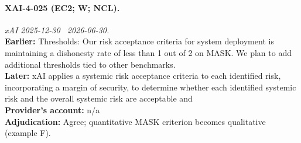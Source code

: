 \paragraph{XAI-4-025 (EC2; W; NCL).} \emph{xAI 2025-12-30 \textrightarrow\ 2026-06-30.}\\
\textbf{Earlier:} Thresholds: Our risk acceptance criteria for system deployment is maintaining a dishonesty rate of less than 1 out of 2 on MASK. We plan to add additional thresholds tied to other benchmarks.\\
\textbf{Later:} xAI applies a systemic risk acceptance criteria to each identified risk, incorporating a margin of security, to determine whether each identified systemic risk and the overall systemic risk are acceptable and\\
\textbf{Provider's account:} n/a\\
\textbf{Adjudication:} Agree; quantitative MASK criterion becomes qualitative (example F).
